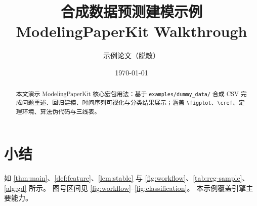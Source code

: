 \documentclass[UTF8,a4paper,zihao=-4,fontset=none]{ctexart}
\title{合成数据预测建模示例\\{\large ModelingPaperKit Walkthrough}}
\author{示例论文（脱敏）}
\date{\today}
\begin{document}
\maketitle

\begin{abstract}
本文演示 ModelingPaperKit 核心宏包用法：基于 \texttt{examples/dummy\_data/} 合成 CSV
完成问题重述、回归建模、时间序列可视化与分类结果展示；涵盖
\texttt{\textbackslash figplot}、\texttt{\textbackslash cref}、定理环境、算法伪代码与三线表。
\end{abstract}


\tableofcontents
\clearpage






\section{小结}
如 \cref{thm:main}、\cref{def:feature}、\cref{lem:stable} 与 \cref{fig:workflow}、\cref{tab:reg-sample}、\cref{alg:gd} 所示。
图号区间见 \ref{fig:workflow}--\ref{fig:classification}。
本示例覆盖引擎主要能力。



\end{document}
